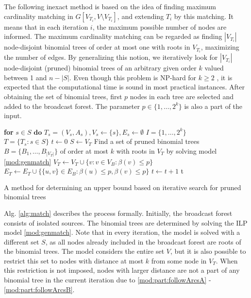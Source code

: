 The following inexact method is based on the idea of finding maximum cardinality matching in $G\left[V_{T_i},V\setminus V_{T_i}\right]$, and extending $T_i$ by this matching.
It means that in each iteration $i$, the maximum possible number of nodes are informed.
The maximum cardinality matching can be regarded as finding $|V_{T_i}|$ node-disjoint  binomial trees of order at most one with roots in $V_{T_i}$, maximizing the number of edges.
By generalizing this notion, we iteratively look for $|V_{T_i}|$ node-disjoint (pruned) binomial trees of an arbitrary given order $k$ valued between 1 and $n-|S|$.
Even though this problem is NP-hard for $k\geq 2$ \cite{jansen95}, it is expected that the computational time is sound in most practical instances.
After obtaining the set of binomial trees, first $p$ nodes in each tree are selected and added to the broadcast forest.
The parameter $p\in \{1,\dots,2^k\}$ is also a part of the input.
\begin{algorithm}[]
\textbf{for }$s\in S\textbf{ do }T_s=(V_s,A_s), V_s\leftarrow \{s\}, E_s\leftarrow\emptyset$\;
$I=\{1,\dots,2^k\}$\\
$T=\{T_s:s\in S\}$\;
$t\leftarrow 0$\;
 {
	$S\leftarrow V_T$\;
	Find a set of pruned binomial trees $B=\{B_1,\dots,B_{|V_T|}\}$ of order at most $k$ with roots in $V_T$ by solving model \eqref{mod:genmatch}\;
	$V_T\leftarrow V_T\cup \{v:v\in V_B:\beta(v)\leq p\}$\;
	$E_T\leftarrow E_T\cup \{\{u,v\}\in E_B: \beta(u)\leq p,\beta(v)\leq p\}$\;
	$t\leftarrow t+1$\;
}
\Return t\;
 \caption{A method for determining an upper bound based on iterative search for pruned binomial trees}
\label{alg:match}
\end{algorithm}

Alg. \ref{alg:match} describes the process formally.
Initially, the broadcast forest consists of isolated sources.
The binomial trees are determined by solving the ILP model \eqref{mod:genmatch}. 
Note that in every iteration, the model is solved with a different set $S$, as all nodes already included in the broadcast forest are roots of the binomial trees.
The model considers the entire set $V$, but it is also possible to restrict this set to nodes with distance at most $k$ from some node in $V_T$.
When this restriction is not imposed, nodes with larger distance are not a part of any binomial tree in the current iteration due to \eqref{mod:part:followArcsA} - \eqref{mod:part:followArcsB}.

